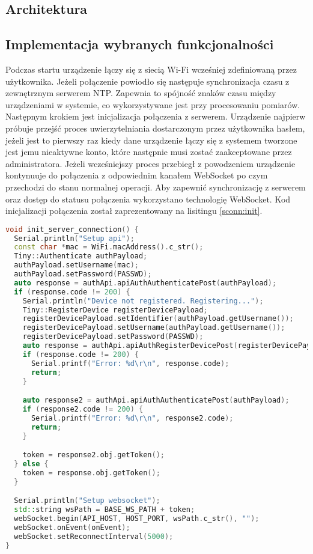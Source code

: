 \subsection{Architektura}

\subsection{Implementacja wybranych funkcjonalności}
Podczas startu urządzenie łączy się z siecią Wi-Fi wcześniej zdefiniowaną przez użytkownika.
Jeżeli połączenie powiodło się następuje synchronizacja czasu z zewnętrznym serwerem NTP.
Zapewnia to spójność znaków czasu między urządzeniami w systemie, co wykorzystywane jest
przy procesowaniu pomiarów. Następnym krokiem jest inicjalizacja połączenia z serwerem.
Urządzenie najpierw próbuje przejść proces uwierzytelniania dostarczonym przez użytkownika
hasłem, jeżeli jest to pierwszy raz kiedy dane urządzenie łączy się z systemem tworzone jest
jemu nieaktywne konto, które następnie musi zostać zaakceptowane przez administratora.
Jeżeli wcześniejszy proces przebiegł z powodzeniem urządzenie kontynuuje do połączenia
z odpowiednim kanałem WebSocket po czym przechodzi do stanu normalnej operacji.
Aby zapewnić synchronizację z serwerem oraz dostęp do statusu połączenia wykorzystano
technologię WebSocket. Kod inicjalizacji połączenia został zaprezentowany na lisitingu
\ref{sconn:init}.
\begin{lstlisting}[language={C++},caption={Utworzenie konta i połączenie z serwerem},label={sconn:init},captionpos=b]
void init_server_connection() {
  Serial.println("Setup api");
  const char *mac = WiFi.macAddress().c_str();
  Tiny::Authenticate authPayload;
  authPayload.setUsername(mac);
  authPayload.setPassword(PASSWD);
  auto response = authApi.apiAuthAuthenticatePost(authPayload);
  if (response.code != 200) {
    Serial.println("Device not registered. Registering...");
    Tiny::RegisterDevice registerDevicePayload;
    registerDevicePayload.setIdentifier(authPayload.getUsername());
    registerDevicePayload.setUsername(authPayload.getUsername());
    registerDevicePayload.setPassword(PASSWD);
    auto response = authApi.apiAuthRegisterDevicePost(registerDevicePayload);
    if (response.code != 200) {
      Serial.printf("Error: %d\r\n", response.code);
      return;
    }

    auto response2 = authApi.apiAuthAuthenticatePost(authPayload);
    if (response2.code != 200) {
      Serial.printf("Error: %d\r\n", response2.code);
      return;
    }

    token = response2.obj.getToken();
  } else {
    token = response.obj.getToken();
  }

  Serial.println("Setup websocket");
  std::string wsPath = BASE_WS_PATH + token;
  webSocket.begin(API_HOST, HOST_PORT, wsPath.c_str(), "");
  webSocket.onEvent(onEvent);
  webSocket.setReconnectInterval(5000);
}
\end{lstlisting}
